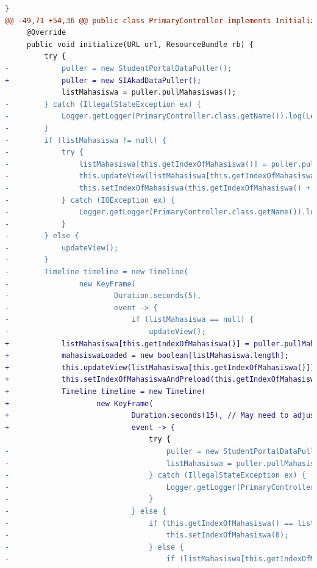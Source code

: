 \begin{lstlisting}[language=diff, caption=Perbedaan kode dosen dengan mahasiswa, label=diff_dosen_mahasiswa]
     }
@@ -49,71 +54,36 @@ public class PrimaryController implements Initializable {
     @Override
     public void initialize(URL url, ResourceBundle rb) {
         try {
-            puller = new StudentPortalDataPuller();
+            puller = new SIAkadDataPuller();
             listMahasiswa = puller.pullMahasiswas();
-        } catch (IllegalStateException ex) {
-            Logger.getLogger(PrimaryController.class.getName()).log(Level.SEVERE, null, ex);
-        }
-        if (listMahasiswa != null) {
-            try {
-                listMahasiswa[this.getIndexOfMahasiswa()] = puller.pullMahasiswaDetail(listMahasiswa[this.getIndexOfMahasiswa()]);
-                this.updateView(listMahasiswa[this.getIndexOfMahasiswa()]);
-                this.setIndexOfMahasiswa(this.getIndexOfMahasiswa() + 1);
-            } catch (IOException ex) {
-                Logger.getLogger(PrimaryController.class.getName()).log(Level.SEVERE, null, ex);
-            }
-        } else {
-            updateView();
-        }
-        Timeline timeline = new Timeline(
-                new KeyFrame(
-                        Duration.seconds(5),
-                        event -> {
-                            if (listMahasiswa == null) {
-                                updateView();
+            listMahasiswa[this.getIndexOfMahasiswa()] = puller.pullMahasiswaDetail(listMahasiswa[this.getIndexOfMahasiswa()]);
+            mahasiswaLoaded = new boolean[listMahasiswa.length];
+            this.updateView(listMahasiswa[this.getIndexOfMahasiswa()]);
+            this.setIndexOfMahasiswaAndPreload(this.getIndexOfMahasiswa() + 1);
+            Timeline timeline = new Timeline(
+                    new KeyFrame(
+                            Duration.seconds(15), // May need to adjust longer if internet is slow
+                            event -> {
                                 try {
-                                    puller = new StudentPortalDataPuller();
-                                    listMahasiswa = puller.pullMahasiswas();
-                                } catch (IllegalStateException ex) {
-                                    Logger.getLogger(PrimaryController.class.getName()).log(Level.SEVERE, null, ex);
-                                }
-                            } else {
-                                if (this.getIndexOfMahasiswa() == listMahasiswa.length) {
-                                    this.setIndexOfMahasiswa(0);
-                                } else {
-                                    if (listMahasiswa[this.getIndexOfMahasiswa()].getTanggalLahir() == null) {

\end{lstlisting}

